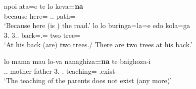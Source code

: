 \begin{exe}\ex\label{SavExist}
\begin{xlist} 
\ex\gll apoi ata=e te lo keva\textbf{=na}\\
because here=\emphat{} \emphat{} \deter{}.\sg{}.\mas{} path=\nom{}\\
\glt `Because here (is ) the road.'
\ex\gll lo lo buringa=la=e edo kola=ga\\
3\sg{}.\mas{} 3\sg{}.\mas{}.\gen{} back=\loc{}.\mas{}=\emphat{} two tree=\pl{}\\
\glt `At his back (are) two trees./ There are two trees at his back.'
\ex\raggedright\gll lo mama mau lo-va nanaghiza\textbf{=na} te baighoza-i\\
\deter{}.\sg{}.\mas{} mother father 3\sg{}.\mas{}-\gen{}.\mas{} teaching=\nom{} \emphat{} \Neg{}.exist-\fin{}\\
\glt `The teaching of the parents does not exist (any more)'
\end{xlist}
\end{exe}





